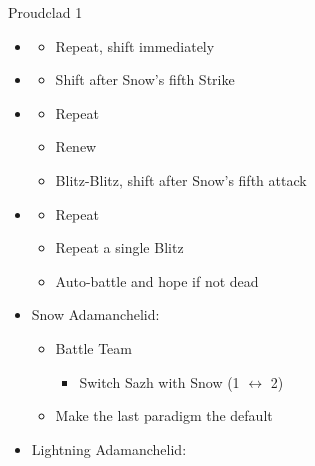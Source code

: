\begin{multicols}{2}
\begin{battle}[1:31]{Proudclad 1}
\begin{itemize}
    \item \fifth
          \begin{itemize}
            \item Repeat, shift immediately
          \end{itemize}
    \item \sixth
          \begin{itemize}
            \item Shift after Snow's fifth Strike
          \end{itemize}
    \item \first
          \begin{itemize}
            \item Repeat
            \item Renew
            \item Blitz-Blitz, shift after Snow's fifth attack
          \end{itemize}
    \item \second
          \begin{itemize}
            \item Repeat
            \item Repeat a single Blitz
            \item Auto-battle and hope if not dead
          \end{itemize}
  \end{itemize}
\end{battle}
\vfill
\begin{menu}
  \begin{itemize}
    \item Snow Adamanchelid:
          \begin{itemize}
            \paradigm
            \begin{itemize}
              \item Battle Team
                    \begin{itemize}
                      \item Switch Sazh with Snow (1 $\leftrightarrow$ 2)
                    \end{itemize}
              \item Make the last paradigm the default
            \end{itemize}
          \end{itemize}
    \item Lightning Adamanchelid:
          \begin{itemize}
            \paradigm
            \begin{itemize}

\end{itemize}
\end{itemize}
\end{itemize}
\end{menu}
\end{multicols}
